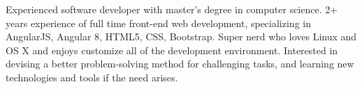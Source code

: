 

\begin{cvparagraph}

Experienced software developer with master's degree in computer science. 2+ years experience of full time front-end web development, specializing in AngularJS, Angular 8, HTML5, CSS, Bootstrap. Super nerd who loves Linux and OS X and enjoys customize all of the development environment. Interested in devising a better problem-solving method for challenging tasks, and learning new technologies and tools if the need arises.
\end{cvparagraph}
